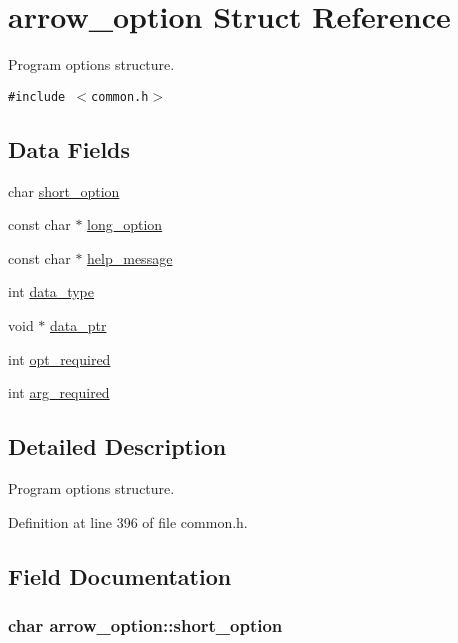 \hypertarget{structarrow__option}{
\section{arrow\_\-option Struct Reference}
\label{structarrow__option}
}
Program options structure.  


{\tt \#include $<$common.h$>$}

\subsection*{Data Fields}
\begin{CompactItemize}
\item 
char \hyperlink{structarrow__option_f47f3010fcddb84f4a67920db03d7233}{short\_\-option}
\item 
const char $\ast$ \hyperlink{structarrow__option_3d8ddc7b0d627a15c7108e21a16cb51a}{long\_\-option}
\item 
const char $\ast$ \hyperlink{structarrow__option_48bfe5bda71cd04d92067b203ffb92ce}{help\_\-message}
\item 
int \hyperlink{structarrow__option_c97df040be0b7c76e92556087be21ff8}{data\_\-type}
\item 
void $\ast$ \hyperlink{structarrow__option_0b4e8cc50fdb7d8fbb1e63db30cd172d}{data\_\-ptr}
\item 
int \hyperlink{structarrow__option_2e7290d4b7088eab30df5f3bfc34ce93}{opt\_\-required}
\item 
int \hyperlink{structarrow__option_59aa495c8bd2e4d57014e4d9278020ed}{arg\_\-required}
\end{CompactItemize}


\subsection{Detailed Description}
Program options structure. 

Definition at line 396 of file common.h.

\subsection{Field Documentation}
\hypertarget{structarrow__option_f47f3010fcddb84f4a67920db03d7233}{
\subsubsection{\setlength{\rightskip}{0pt plus 5cm}char {\bf arrow\_\-option::short\_\-option}}}
\label{structarrow__option_f47f3010fcddb84f4a67920db03d7233}


